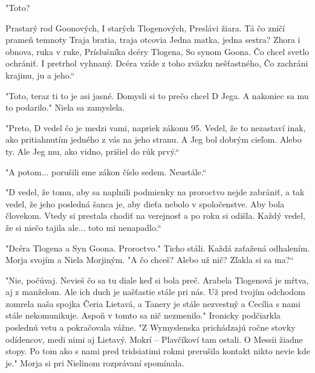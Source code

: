 \documentclass{book}
\begin{document}
"Toto?

\begin{center}
Prastarý rod Goonových, I starých Tlogenových,
Preslávi žiara. Tá čo zničí prameň temnoty
Traja bratia, traja otcovia Jedna
matka, jedna sestra? Zhora i obnova,
ruka v ruke, Príslušníka dcéry
Tlogena, So synom Goona. Čo
chcel svetlo ochrániť. I pretrhol
vyhnaný.
Dcéra vzíde z toho
zväzku nešťastného, Čo zachráni krajinu, ju a jeho.“
\end{center}

"Toto, teraz ti to je asi jasné. Domysli si to prečo chcel D Jega. A nakoniec sa mu to podarilo."$ $ Niela sa zamyslela.

"Preto, D vedel čo je medzi vami, napriek zákonu 95. Vedel, že to nezastaví inak, ako pritiahnutím jedného z vás na jeho stranu. A Jeg bol dobrým cieľom. Alebo ty. Ale Jeg mu, ako vidno, prišiel do rúk prvý.“

"$ $A potom... porušili sme zákon číslo sedem. Neustále.“

"D vedel, že tomu, aby sa naplnili podmienky na proroctvo nejde zabrániť, a tak vedel, že jeho posledná šanca je, aby dieťa nebolo v spoločenstve. Aby bola človekom. Vtedy si prestala chodiť na verejnosť a po roku si odišla. Každý vedel, že si niečo tajila ale... toto mi nenapadlo.“

"Dcéra Tlogena a Syn Goona. Proroctvo."$ $ Ticho stáli. Každá zaťažená odhalením. Morja svojím a Niela Morjiným. "$ $A čo chceš? Alebo už nič? Zľakla si sa ma?“

"Nie, počúvaj. Nevieš čo sa tu diale keď si bola preč. Arabela Tlogenová je mŕtva, aj z manželom. Ale ich duch je našťastie stále pri nás. Už pred tvojím odchodom zomrela naša spojka Čeria Lietavá, a Tanery je stále nezvestný a Cecília s nami stále nekomunikuje. Aspoň v tomto sa nič nezmenilo."$ $ Ironicky podčiarkla poslednú vetu a pokračovala vážne. "Z Wymyslenska prichádzajú ročne stovky odídencov, medi nimi aj Lietavý. Mokrí – Plavčíkoví tam ostali. O Messii žiadne stopy. Po tom ako s nami pred tridsiatimi rokmi prerušila kontakt nikto nevie kde je."$ $ Morja si pri Nielinom rozprávaní spomínala.
\end{document}
